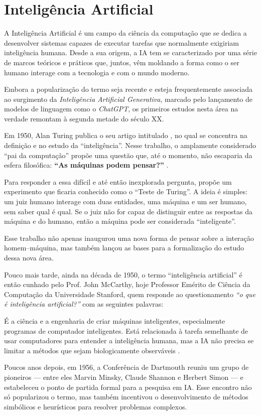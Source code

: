 \section{Inteligência Artificial} \label{sec:ia}

A Inteligência Artificial é um campo da ciência da computação que se dedica a desenvolver sistemas capazes de executar tarefas que normalmente exigiriam inteligência humana. Desde a sua origem, a IA tem se caracterizado por uma série de marcos teóricos e práticos que, juntos, vêm moldando a forma como o ser humano interage com a tecnologia e com o mundo moderno.

Embora a popularização do termo seja recente e esteja frequentemente associada ao surgimento da \emph{Inteligência Artificial Generativa}, marcado pelo lançamento de modelos de linguagem como o \emph{ChatGPT}, os primeiros estudos nesta área na verdade remontam à segunda metade do século XX.

Em 1950, Alan Turing publica o seu artigo intitulado , no qual se concentra na definição e no estudo da ``inteligência''. Nesse trabalho, o amplamente considerado ``pai da computação'' propõe uma questão que, até o momento, não escaparia da esfera filosófica: \textbf{``As máquinas podem pensar?''} \cite{turing1950}.

Para responder a essa difícil e até então inexplorada pergunta, \citeauthor{turing1950} propõe um experimento que ficaria conhecido como o ``Teste de Turing''. A ideia é simples: um juiz humano interage com duas entidades, uma máquina e um ser humano, sem saber qual é qual. Se o juiz não for capaz de distinguir entre as respostas da máquina e do humano, então a máquina pode ser considerada ``inteligente''.

Esse trabalho não apenas inaugurou uma nova forma de pensar sobre a interação homem--máquina, mas também lançou as bases para a formalização do estudo dessa nova área.

Pouco mais tarde, ainda na década de 1950, o termo ``inteligência artificial'' é então cunhado pelo Prof. John McCarthy, hoje Professor Emérito de Ciência da Computação da Universidade Stanford, quem responde ao questionamento \emph{``o que é inteligência artificial?''} com as seguintes palavras:

\begin{citacao}[english]
   É a ciência e a engenharia de criar máquinas inteligentes, especialmente programas de computador inteligentes. Está relacionada à tarefa semelhante de usar computadores para entender a inteligência humana, mas a IA não precisa se limitar a métodos que sejam biologicamente observáveis \cite[tradução própria]{mccarthy2007}.
\end{citacao}

Poucos anos depois, em 1956, a Conferência de Dartmouth reuniu um grupo de pioneiros --- entre eles Marvin Minsky, Claude Shannon e Herbert Simon --- e estabeleceu o ponto de partida formal para a pesquisa em IA. Esse encontro não só popularizou o termo, mas também incentivou o desenvolvimento de métodos simbólicos e heurísticos para resolver problemas complexos.
